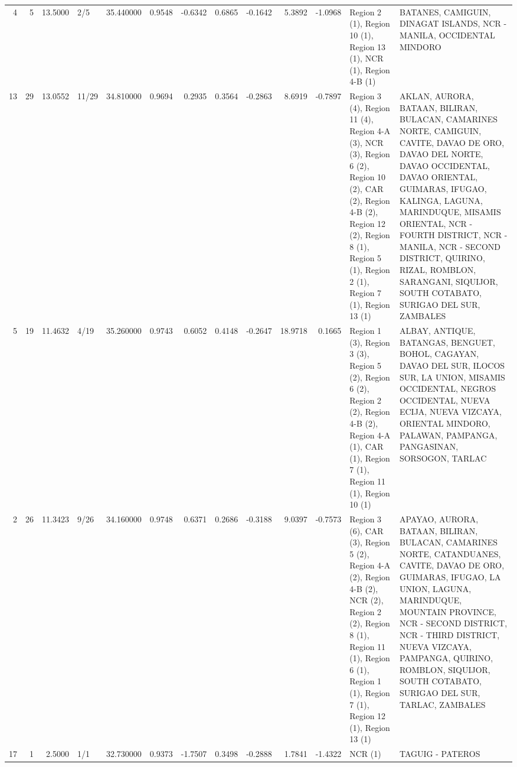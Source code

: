 \begin{tabular}{rrrlrrrrrrrll}
4 & 5 & {\cellcolor[HTML]{96B7FF}} \color[HTML]{000000} 13.5000 & 2/5 & {\cellcolor[HTML]{7093F3}} \color[HTML]{F1F1F1} 35.440000 & 0.9548 & -0.6342 & 0.6865 & -0.1642 & 5.3892 & -1.0968 & Region 2 (1), Region 10 (1), Region 13 (1), NCR (1), Region 4-B (1) & BATANES, CAMIGUIN, DINAGAT ISLANDS, NCR - MANILA, OCCIDENTAL MINDORO \\
13 & 29 & {\cellcolor[HTML]{92B4FE}} \color[HTML]{000000} 13.0552 & 11/29 & {\cellcolor[HTML]{6384EB}} \color[HTML]{F1F1F1} 34.810000 & 0.9694 & 0.2935 & 0.3564 & -0.2863 & 8.6919 & -0.7897 & Region 3 (4), Region 11 (4), Region 4-A (3), NCR (3), Region 6 (2), Region 10 (2), CAR (2), Region 4-B (2), Region 12 (2), Region 8 (1), Region 5 (1), Region 2 (1), Region 7 (1), Region 13 (1) & AKLAN, AURORA, BATAAN, BILIRAN, BULACAN, CAMARINES NORTE, CAMIGUIN, CAVITE, DAVAO DE ORO, DAVAO DEL NORTE, DAVAO OCCIDENTAL, DAVAO ORIENTAL, GUIMARAS, IFUGAO, KALINGA, LAGUNA, MARINDUQUE, MISAMIS ORIENTAL, NCR - FOURTH DISTRICT, NCR - MANILA, NCR - SECOND DISTRICT, QUIRINO, RIZAL, ROMBLON, SARANGANI, SIQUIJOR, SOUTH COTABATO, SURIGAO DEL SUR, ZAMBALES \\
5 & 19 & {\cellcolor[HTML]{84A7FC}} \color[HTML]{F1F1F1} 11.4632 & 4/19 & {\cellcolor[HTML]{6C8FF1}} \color[HTML]{F1F1F1} 35.260000 & 0.9743 & 0.6052 & 0.4148 & -0.2647 & 18.9718 & 0.1665 & Region 1 (3), Region 3 (3), Region 5 (2), Region 6 (2), Region 2 (2), Region 4-B (2), Region 4-A (1), CAR (1), Region 7 (1), Region 11 (1), Region 10 (1) & ALBAY, ANTIQUE, BATANGAS, BENGUET, BOHOL, CAGAYAN, DAVAO DEL SUR, ILOCOS SUR, LA UNION, MISAMIS OCCIDENTAL, NEGROS OCCIDENTAL, NUEVA ECIJA, NUEVA VIZCAYA, ORIENTAL MINDORO, PALAWAN, PAMPANGA, PANGASINAN, SORSOGON, TARLAC \\
2 & 26 & {\cellcolor[HTML]{82A6FB}} \color[HTML]{F1F1F1} 11.3423 & 9/26 & {\cellcolor[HTML]{5572DF}} \color[HTML]{F1F1F1} 34.160000 & 0.9748 & 0.6371 & 0.2686 & -0.3188 & 9.0397 & -0.7573 & Region 3 (6), CAR (3), Region 5 (2), Region 4-A (2), Region 4-B (2), NCR (2), Region 2 (2), Region 8 (1), Region 11 (1), Region 6 (1), Region 1 (1), Region 7 (1), Region 12 (1), Region 13 (1) & APAYAO, AURORA, BATAAN, BILIRAN, BULACAN, CAMARINES NORTE, CATANDUANES, CAVITE, DAVAO DE ORO, GUIMARAS, IFUGAO, LA UNION, LAGUNA, MARINDUQUE, MOUNTAIN PROVINCE, NCR - SECOND DISTRICT, NCR - THIRD DISTRICT, NUEVA VIZCAYA, PAMPANGA, QUIRINO, ROMBLON, SIQUIJOR, SOUTH COTABATO, SURIGAO DEL SUR, TARLAC, ZAMBALES \\
17 & 1 & {\cellcolor[HTML]{3B4CC0}} \color[HTML]{F1F1F1} 2.5000 & 1/1 & {\cellcolor[HTML]{3B4CC0}} \color[HTML]{F1F1F1} 32.730000 & 0.9373 & -1.7507 & 0.3498 & -0.2888 & 1.7841 & -1.4322 & NCR (1) & TAGUIG - PATEROS \\
\bottomrule
\end{tabular}
